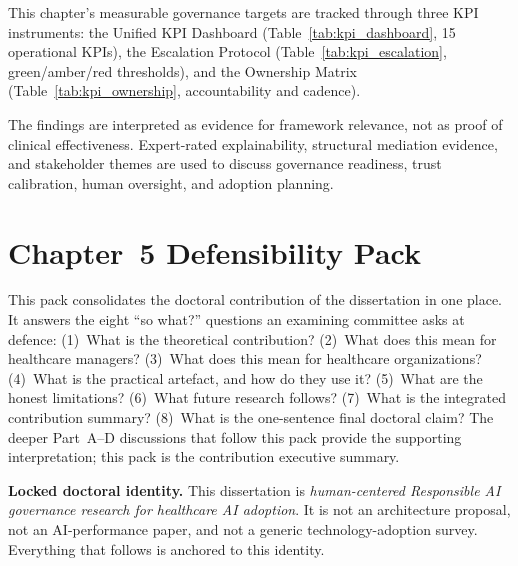 \noindent This chapter's measurable governance targets are tracked through three KPI instruments: the Unified KPI Dashboard (Table~\ref{tab:kpi_dashboard}, 15 operational KPIs), the Escalation Protocol (Table~\ref{tab:kpi_escalation}, green/amber/red thresholds), and the Ownership Matrix (Table~\ref{tab:kpi_ownership}, accountability and cadence).
\vspace{0.5em}

The findings are interpreted as evidence for framework relevance, not as proof of clinical effectiveness. Expert-rated explainability, structural mediation evidence, and stakeholder themes are used to discuss governance readiness, trust calibration, human oversight, and adoption planning.


\section*{Chapter~5 Defensibility Pack}
\label{sec:ch5_defensibility_pack}

\noindent This pack consolidates the doctoral contribution of the dissertation in one place. It answers the eight ``so what?'' questions an examining committee asks at defence: (1)~What is the theoretical contribution? (2)~What does this mean for healthcare managers? (3)~What does this mean for healthcare organizations? (4)~What is the practical artefact, and how do they use it? (5)~What are the honest limitations? (6)~What future research follows? (7)~What is the integrated contribution summary? (8)~What is the one-sentence final doctoral claim? The deeper Part~A--D discussions that follow this pack provide the supporting interpretation; this pack is the contribution executive summary.

\noindent\textbf{Locked doctoral identity.} This dissertation is \emph{human-centered Responsible AI governance research for healthcare AI adoption}. It is not an architecture proposal, not an AI-performance paper, and not a generic technology-adoption survey. Everything that follows is anchored to this identity.

